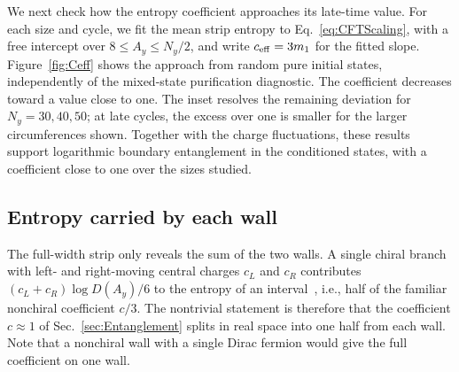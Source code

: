 \documentclass[aps,prb,10pt,twocolumn,superscriptaddress,longbibliography,floatfix]{revtex4-2}
\newcommand{\newtext}[1]{{\color{blue}#1}}
\newcommand{\claudeadd}[1]{{\color{orange}#1}}
\begin{document}
{\color{blue}
We next check how the entropy coefficient approaches its late-time value. For each size and cycle, we fit the mean strip entropy to Eq.~\eqref{eq:CFTScaling}, with a free intercept over $8\leq A_y\leq N_y/2$, and write $c_{\rm eff}=3m_1$ for the fitted slope. Figure~\ref{fig:Ceff} shows the approach from random pure initial states, independently of the mixed-state purification diagnostic. The coefficient decreases toward a value close to one. The inset resolves the remaining deviation for $N_y=30,40,50$; at late cycles, the excess over one is smaller for the larger circumferences shown. \claudeadd{Together with the charge fluctuations, these results support logarithmic boundary entanglement in the conditioned states, with a coefficient close to one over the sizes studied.}
}




{\color{blue}\subsection{Entropy carried by each wall}
\label{sec:ChiralCentralCharge}}

The full-width strip only reveals the sum of the two walls. A single chiral branch with left- and right-moving central charges $c_L$ and $c_R$ contributes \newtext{$(c_L+c_R)\log D(A_y)/6$} to the entropy of an interval~\cite{CalabreseCardy2004,CastroDetournayIqbalPerlmutter2014}, i.e., half of the familiar nonchiral coefficient $c/3$. The nontrivial statement is therefore that the coefficient $c\approx1$ of Sec.~\ref{sec:Entanglement} splits in real space into one half from each wall. Note that a nonchiral wall with a single Dirac fermion would give the full coefficient on one wall.
\end{document}
